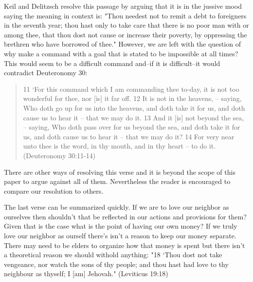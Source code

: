 \documentclass[11pt]{article}
\begin{document}
Keil and Delitzsch resolve this passage by arguing that it is in the jussive mood saying the meaning in context is: "Thou needest not to remit a debt to foreigners in the seventh year; thou hast only to take care that there is no poor man with or among thee, that thou dost not cause or increase their poverty, by oppressing the brethren who have borrowed of thee." \cite{jussive mood kd} However, we are left with the question of why make a command with a goal that is stated to be impossible at all times? This would seem to be a difficult command and--if it is difficult--it would contradict Deuteronomy 30:
\begin{quote}
11 `For this command which I am commanding thee to-day, it is not too wonderful for thee, nor [is] it far off.
12 It is not in the heavens, -- saying, Who doth go up for us into the heavens, and doth take it for us, and doth cause us to hear it -- that we may do it.
13 And it [is] not beyond the sea, -- saying, Who doth pass over for us beyond the sea, and doth take it for us, and doth cause us to hear it -- that we may do it?
14 For very near unto thee is the word, in thy mouth, and in thy heart -- to do it. (Deuteronomy 30:11-14)
\end{quote}
There are other ways of resolving this verse and it is beyond the scope of this paper to argue against all of them. Nevertheless the reader is encouraged to compare our resolution to others.

The last verse can be summarized quickly. If we are to love our neighbor as ourselves then shouldn't that be reflected in our actions and provisions for them? Given that is the case what is the point of having our own money? If we truly love our neighbor as ourself there's isn't a reason to keep our money separate. There may need to be elders to organize how that money is spent but there isn't a theoretical reason we should withold anything:
"18 `Thou dost not take vengeance, nor watch the sons of thy people; and thou hast had love to thy neighbour as thyself; I [am] Jehovah."
(Leviticus 19:18)
\end{document}
